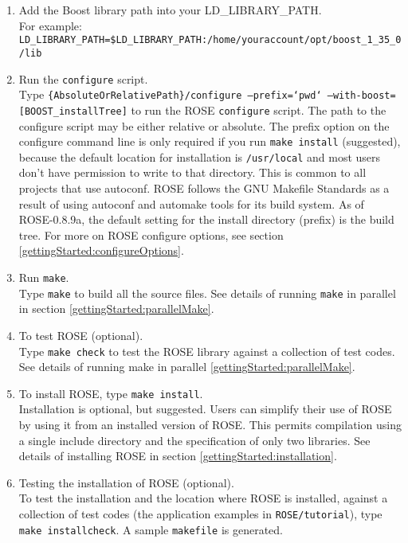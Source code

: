 \begin{enumerate}
     \item Add the Boost library path into your LD\_LIBRARY\_PATH.\\
           For example: {\tt
           LD\_LIBRARY\_PATH=\$LD\_LIBRARY\_PATH:/home/youraccount/opt/boost\_1\_35\_0/lib}
     \item Run the {\tt configure} script. \\
           Type {\tt \{AbsoluteOrRelativePath\}/configure --prefix=`pwd` --with-boost=[BOOST\_installTree]} 
           to run the ROSE {\tt configure} script.  The path to the configure script 
           may be either relative or absolute. The prefix option on the configure 
           command line is only required if you run {\tt make install} (suggested), because 
           the default location for installation is {\tt \//usr\//local} and most users don't
           have permission to write to that directory. This is common to all projects that
           use autoconf.  ROSE follows the GNU Makefile Standards as a result of using
           autoconf and automake tools for its build system. As of ROSE-0.8.9a, the
           default setting for the install directory (prefix) is the build tree.
           For more on ROSE configure options, see section \ref{gettingStarted:configureOptions}.
     \item Run {\tt make}. \\
           Type {\tt make} to build all the source files. See details of running 
           {\tt make} in parallel in section \ref{gettingStarted:parallelMake}.
     \item To test ROSE (optional). \\
           Type {\tt make check} to test the ROSE library against a collection of test codes.
           See details of running make in parallel \ref{gettingStarted:parallelMake}.
     \item To install ROSE, type {\tt make install}. \\
           Installation is optional, but suggested. Users can simplify their use of ROSE 
           by using it from an installed version of ROSE.  This permits compilation 
           using a single include directory and the specification of only two libraries.
           See details of installing ROSE in section \ref{gettingStarted:installation}.
     \item Testing the installation of ROSE (optional). \\
           To test the installation and the location where ROSE is installed, against a
           collection of test codes (the application examples in {\tt ROSE/tutorial}), 
           type {\tt make installcheck}.
           A sample {\tt makefile} is generated.%
\end{enumerate}
